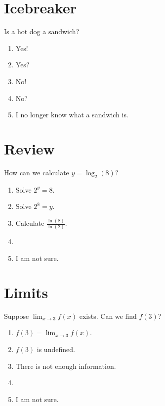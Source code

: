 \documentclass[14pt]{beamer}
\begin{document}
 

\section{Icebreaker}

\begin{frame}
  Is a hot dog a sandwich?
  
  \medskip
  \begin{enumerate} 
    \item Yes!
    \item Yes?
    \item No!
    \item No?
    \item I no longer know what a sandwich is.
  \end{enumerate} 
\end{frame}


\section{Review}
\begin{frame}
  How can we calculate \(y = \log_{2}(8)\)?
  \medskip
  \begin{enumerate} 
    \item Solve \(2^{y} = 8\).
    \item Solve \(2^{8} = y\).
    \item Calculate \(\frac{\ln(8)}{\ln(2)}\). 
    \item 
    \item I am not sure.
  \end{enumerate} 
\end{frame} 


\section{Limits}
\begin{frame}
  Suppose \(\lim_{x \to 3} f(x)\) exists. Can we find \(f(3)\)?

  \medskip
  \begin{enumerate} 
    \item \(f(3) = \lim_{x \to 3} f(x)\).
    \item \(f(3)\) is undefined.
    \item There is not enough information.
    \item 
    \item I am not sure.
  \end{enumerate} 
\end{frame} 
\end{document}
